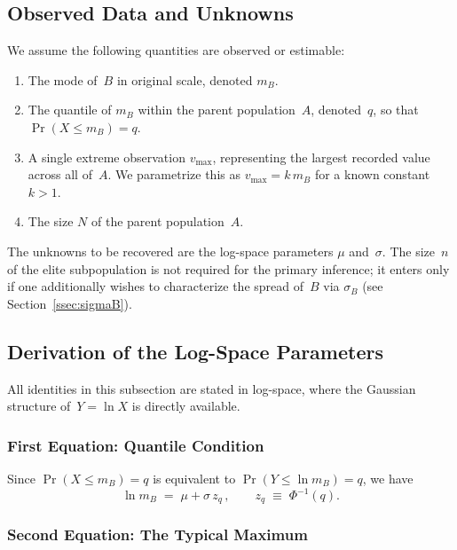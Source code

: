 \documentclass{article}
\begin{document}
\subsection{Observed Data and Unknowns}\label{ssec:data}

We assume the following quantities are observed or estimable:
\begin{enumerate}
  \item[\textbf{D1.}]
    The mode of~$B$ in original scale, denoted $m_B$.
  \item[\textbf{D2.}]
    The quantile of $m_B$ within the parent population~$A$, denoted~$q$,
    so that $\Pr(X \le m_B) = q$.
  \item[\textbf{D3.}]
    A single extreme observation $v_{\max}$, representing the largest
    recorded value across all of~$A$. We parametrize this as
    $v_{\max} = k\,m_B$ for a known constant~$k > 1$.
  \item[\textbf{D4.}]
    The size $N$ of the parent population~$A$.
\end{enumerate}
The unknowns to be recovered are the log-space parameters $\mu$
and~$\sigma$. The size~$n$ of the elite subpopulation is not
required for the primary inference; it enters only if one additionally
wishes to characterize the spread of~$B$ via $\sigma_B$ (see
Section~\ref{ssec:sigmaB}).

\subsection{Derivation of the Log-Space Parameters}\label{ssec:derivation}

All identities in this subsection are stated in log-space, where the
Gaussian structure of~$Y = \ln X$ is directly available.

\subsubsection{First Equation: Quantile Condition}

Since $\Pr(X \le m_B) = q$ is equivalent to
$\Pr(Y \le \ln m_B) = q$, we have
\begin{equation}\label{eq:eq1}
  \ln m_B \;=\; \mu + \sigma\,z_q\,,
  \qquad
  z_q \;\equiv\; \Phi^{-1}(q).
\end{equation}

\subsubsection{Second Equation: The Typical Maximum}
\end{document}
